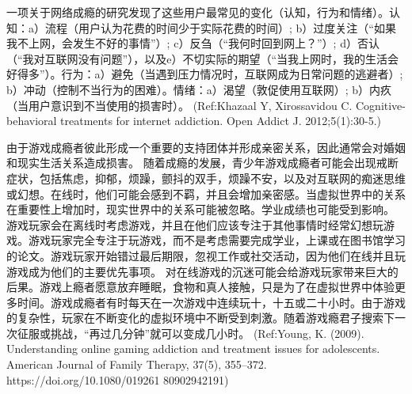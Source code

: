 一项关于网络成瘾的研究发现了这些用户最常见的变化（认知，行为和情绪）。认知：a）流程（用户认为花费的时间少于实际花费的时间）; b）过度关注（“如果我不上网，会发生不好的事情”）; c）反刍（“我何时回到网上？”）; d）否认（“我对互联网没有问题”），以及e）不切实际的期望（“当我上网时，我的生活会好得多”）。行为：a）避免（当遇到压力情况时，互联网成为日常问题的逃避者）; b）冲动（控制不当行为的困难）。情绪：a）渴望（敦促使用互联网）; b）内疚（当用户意识到不当使用的损害时）。
(Ref:Khazaal Y, Xirossavidou C. Cognitive-behavioral treatments for internet addiction. Open Addict J. 2012;5(1):30-5.)

由于游戏成瘾者彼此形成一个重要的支持团体并形成亲密关系，因此通常会对婚姻和现实生活关系造成损害。
随着成瘾的发展，青少年游戏成瘾者可能会出现戒断症状，包括焦虑，抑郁，烦躁，颤抖的双手，烦躁不安，以及对互联网的痴迷思维或幻想。在线时，他们可能会感到不羁，并且会增加亲密感。当虚拟世界中的关系在重要性上增加时，现实世界中的关系可能被忽略。学业成绩也可能受到影响。
游戏玩家会在离线时考虑游戏，并且在他们应该专注于其他事情时经常幻想玩游戏。游戏玩家完全专注于玩游戏，而不是考虑需要完成学业，上课或在图书馆学习的论文。游戏玩家开始错过最后期限，忽视工作或社交活动，因为他们在线并且玩游戏成为他们的主要优先事项。
对在线游戏的沉迷可能会给游戏玩家带来巨大的后果。游戏上瘾者愿意放弃睡眠，食物和真人接触，只是为了在虚拟世界中体验更多时间。游戏成瘾者有时每天在一次游戏中连续玩十，十五或二十小时。由于游戏的复杂性，玩家在不断变化的虚拟环境中不断受到刺激。随着游戏瘾君子搜索下一次征服或挑战，“再过几分钟”就可以变成几小时。
(Ref:Young, K. (2009). Understanding online gaming addiction and treatment issues for adolescents. American Journal of Family Therapy, 37(5), 355–372. https://doi.org/10.1080/019261
80902942191)


